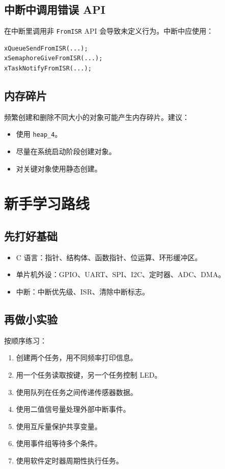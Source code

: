 \documentclass[12pt,a4paper]{ctexart}
\begin{document}
\subsection{中断中调用错误 API}

在中断里调用非 \texttt{FromISR} API 会导致未定义行为。中断中应使用：

\begin{lstlisting}
xQueueSendFromISR(...);
xSemaphoreGiveFromISR(...);
xTaskNotifyFromISR(...);
\end{lstlisting}

\subsection{内存碎片}

频繁创建和删除不同大小的对象可能产生内存碎片。建议：

\begin{itemize}
    \item 使用 \texttt{heap\_4}。
    \item 尽量在系统启动阶段创建对象。
    \item 对关键对象使用静态创建。
\end{itemize}

\section{新手学习路线}

\subsection{先打好基础}

\begin{itemize}
    \item C 语言：指针、结构体、函数指针、位运算、环形缓冲区。
    \item 单片机外设：GPIO、UART、SPI、I2C、定时器、ADC、DMA。
    \item 中断：中断优先级、ISR、清除中断标志。
\end{itemize}

\subsection{再做小实验}

按顺序练习：

\begin{enumerate}
    \item 创建两个任务，用不同频率打印信息。
    \item 用一个任务读取按键，另一个任务控制 LED。
    \item 使用队列在任务之间传递传感器数据。
    \item 使用二值信号量处理外部中断事件。
    \item 使用互斥量保护共享变量。
    \item 使用事件组等待多个条件。
    \item 使用软件定时器周期性执行任务。
\end{enumerate}
\end{document}
